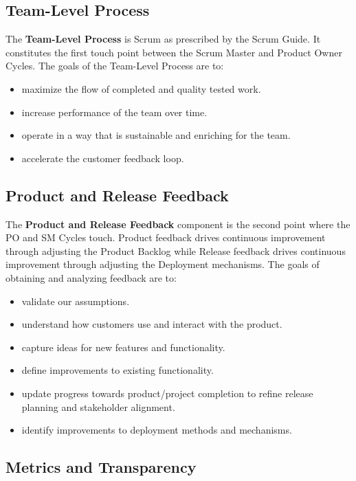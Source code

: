 \documentclass[12pt,a4paper,parskip=full]{scrartcl}
\begin{document}
\subsection{Team-Level Process}

The \textbf{Team-Level Process} is Scrum as prescribed by the Scrum Guide. It constitutes the first touch point between the Scrum Master and Product Owner Cycles. The goals of the Team-Level Process are to:

\begin{itemize}
	\item maximize the flow of completed and quality tested work.
	\item increase performance of the team over time.
	\item operate in a way that is sustainable and enriching for the team.
	\item accelerate the customer feedback loop.
\end{itemize}

\subsection{Product and Release Feedback}

The \textbf{Product and Release Feedback} component is the second point where the PO and SM Cycles touch. Product feedback drives continuous improvement through adjusting the Product Backlog while Release feedback drives continuous improvement through adjusting the Deployment mechanisms. The goals of obtaining and analyzing feedback are to:

\begin{itemize}
	\item validate our assumptions.
	\item understand how customers use and interact with the product.
	\item capture ideas for new features and functionality.
	\item define improvements to existing functionality.
	\item update progress towards product/project completion to refine release planning and stakeholder alignment.
	\item identify improvements to deployment methods and mechanisms.
\end{itemize}

\subsection{Metrics and Transparency}
\end{document}
